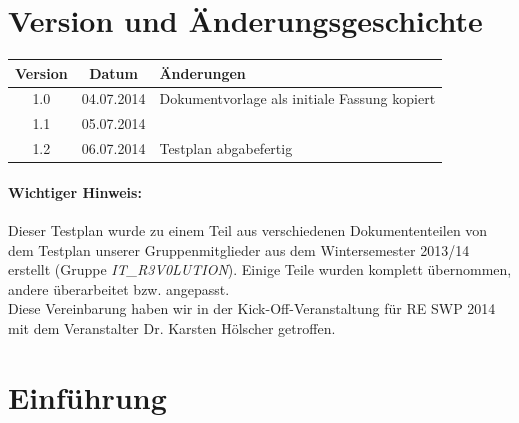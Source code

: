 \documentclass[fontsize=12pt,paper=a4,twoside]{scrartcl}
\begin{document}


\newpage

  \thispagestyle{fancy}
  \fancyhead{}
  \fancyfoot{}
  \renewcommand{\headrulewidth}{0.4pt}
  \tableofcontents

\newpage



\section*{Version und Änderungsgeschichte}

\begin{tabular}{ccl}
Version & Datum & Änderungen \\
\hline
1.0 & 04.07.2014 & Dokumentvorlage als initiale Fassung kopiert \\
1.1 & 05.07.2014 & \\
1.2 & 06.07.2014 & Testplan abgabefertig
\end{tabular}

\paragraph{Wichtiger Hinweis:} Dieser Testplan wurde zu einem Teil aus verschiedenen Dokumententeilen von dem Testplan unserer Gruppenmitglieder aus dem Wintersemester 2013/14 erstellt (Gruppe \textit{IT\_R3V0LUTION}). Einige Teile wurden komplett übernommen, andere überarbeitet bzw. angepasst. \\
Diese Vereinbarung haben wir in der Kick-Off-Veranstaltung für RE SWP 2014 mit dem Veranstalter Dr. Karsten Hölscher getroffen. \\

\section{Einführung}\label{c01}
\end{document}
